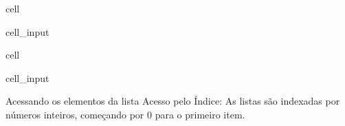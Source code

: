 \documentclass[letterpaper,10pt,english]{jupyterBook}
\begin{document}
\begin{sphinxuseclass}{cell}\begin{sphinxVerbatimInput}

\begin{sphinxuseclass}{cell_input}
\begin{sphinxVerbatim}[commandchars=\\\{\}]
  \PYG{p}{[}\PYG{p}{]}
\end{sphinxVerbatim}

\end{sphinxuseclass}\end{sphinxVerbatimInput}

\end{sphinxuseclass}
\begin{sphinxuseclass}{cell}\begin{sphinxVerbatimInput}

\begin{sphinxuseclass}{cell_input}
\begin{sphinxVerbatim}[commandchars=\\\{\}]
  \PYG{p}{[}\PYG{p}{[}  \PYG{p}{]} \PYG{p}{[}  \PYG{p}{]} \PYG{p}{[}  \PYG{p}{]}\PYG{p}{]}
\end{sphinxVerbatim}

\end{sphinxuseclass}\end{sphinxVerbatimInput}

\end{sphinxuseclass}
\sphinxAtStartPar
Acessando os elementos da lista
Acesso pelo Índice:
As listas são indexadas por números inteiros, começando por 0 para o primeiro item.
\end{document}
